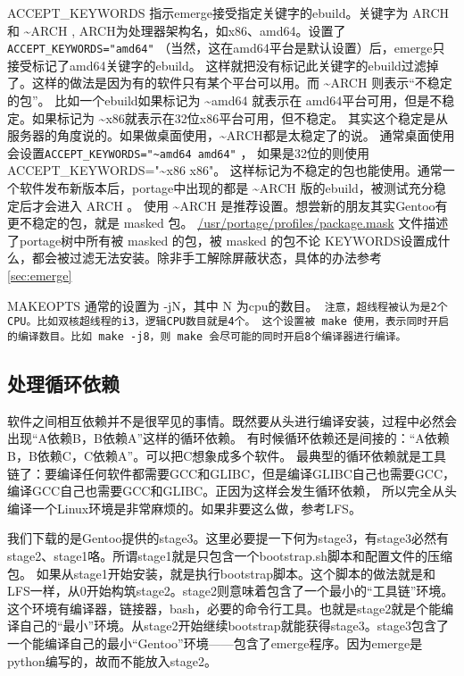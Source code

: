 \documentclass[amstex,twoside]{ctexbook}
\newenvironment{notice}{\tt}{}
\newcommand{\secref}[1]{ { \it节\ref{#1}~\nameref{#1}} }
\begin{document}
ACCEPT\_KEYWORDS%
指示emerge接受指定关键字的ebuild。关键字为 ARCH 和 \textasciitilde{}ARCH , ARCH为处理器架构名，如x86、amd64。设置了{\tt ACCEPT\_KEYWORDS="amd64"} （当然，这在amd64平台是默认设置）后，emerge只接受标记了amd64关键字的ebuild。
这样就把没有标记此关键字的ebuild过滤掉了。这样的做法是因为有的软件只有某个平台可以用。而 \textasciitilde{}ARCH 则表示“不稳定的包”。
比如一个ebuild如果标记为 \textasciitilde{}amd64 就表示在 amd64平台可用，但是不稳定。如果标记为 \textasciitilde{}x86就表示在32位x86平台可用，但不稳定。
其实这个稳定是从服务器的角度说的。如果做桌面使用，\textasciitilde{}ARCH都是太稳定了的说。
通常桌面使用会设置{\tt ACCEPT\_KEYWORDS="\textasciitilde{}amd64 amd64"} ， 如果是32位的则使用ACCEPT\_KEYWORDS="\textasciitilde{}x86 x86"。 这样标记为不稳定的包也能使用。通常一个软件发布新版本后，portage中出现的都是 \textasciitilde{}ARCH 版的ebuild，被测试充分稳定后才会进入 ARCH 。
使用 \textasciitilde{}ARCH 是推荐设置。想尝新的朋友其实Gentoo有更不稳定的包，就是 masked 包。
\url{/usr/portage/profiles/package.mask} 文件描述了portage树中所有被 masked 的包，被 masked 的包不论 KEYWORDS设置成什么，都会被过滤无法安装。除非手工解除屏蔽状态，具体的办法参考 \secref{sec:emerge}

MAKEOPTS%
通常的设置为 -jN，其中 N 为cpu的数目。\begin{notice}
注意，超线程被认为是2个CPU。比如双核超线程的i3，逻辑CPU数目就是4个。
\end{notice} 这个设置被 make 使用，表示同时开启的编译数目。比如 make -j8，则 make 会尽可能的同时开启8个编译器进行编译。


\subsection*{处理循环依赖}
软件之间相互依赖并不是很罕见的事情。既然要从头进行编译安装，过程中必然会出现“A依赖B，B依赖A”这样的循环依赖。
有时候循环依赖还是间接的：“A依赖B，B依赖C，C依赖A”。可以把C想象成多个软件。
最典型的循环依赖就是工具链了：要编译任何软件都需要GCC和GLIBC，但是编译GLIBC自己也需要GCC，编译GCC自己也需要GCC和GLIBC。正因为这样会发生循环依赖，
所以完全从头编译一个Linux环境是非常麻烦的。如果非要这么做，参考LFS。

我们下载的是Gentoo提供的stage3。这里必要提一下何为stage3，有stage3必然有stage2、stage1咯。所谓stage1就是只包含一个bootstrap.sh脚本和配置文件的压缩包。
如果从stage1开始安装，就是执行bootstrap脚本。这个脚本的做法就是和LFS一样，从0开始构筑stage2。stage2则意味着包含了一个最小的“工具链”环境。
这个环境有编译器，链接器，bash，必要的命令行工具。也就是stage2就是个能编译自己的“最小”环境。从stage2开始继续bootstrap就能获得stage3。stage3包含了一个能编译自己的最小“Gentoo”环境——包含了emerge程序。因为emerge是python编写的，故而不能放入stage2。
\end{document}
